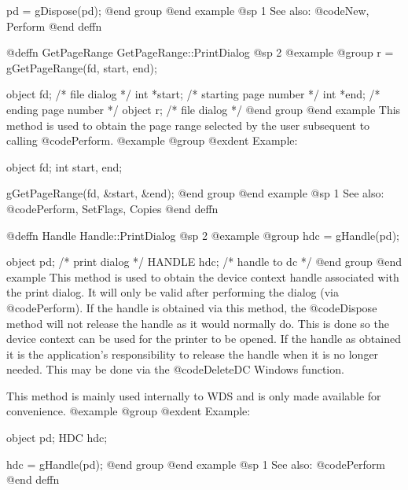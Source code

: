 pd = gDispose(pd);
@end group
@end example
@sp 1
See also:  @code{New, Perform}
@end deffn











@deffn {GetPageRange} GetPageRange::PrintDialog
@sp 2
@example
@group
r = gGetPageRange(fd, start, end);

object  fd;     /*  file dialog           */
int     *start; /*  starting page number  */
int     *end;   /*  ending page number    */
object  r;      /*  file dialog           */
@end group
@end example
This method is used to obtain the page range selected by the user
subsequent to calling @code{Perform}.
@example
@group
@exdent Example:

object  fd;
int     start, end;

gGetPageRange(fd, &start, &end);
@end group
@end example
@sp 1
See also:  @code{Perform, SetFlags, Copies}
@end deffn











@deffn {Handle} Handle::PrintDialog
@sp 2
@example
@group
hdc = gHandle(pd);

object  pd;     /*  print dialog   */
HANDLE  hdc;    /*  handle to dc   */
@end group
@end example
This method is used to obtain the device context handle associated with
the print dialog.  It will only be valid after performing the
dialog (via @code{Perform}).  If the handle is obtained via this method,
the @code{Dispose} method will not release the handle as it would
normally do.  This is done so the device context can be used for the
printer to be opened.  If the handle as obtained it is the application's
responsibility to release the handle when it is no longer needed.  This
may be done via the @code{DeleteDC} Windows function.

This method is mainly used internally to WDS and is only made available
for convenience.
@example
@group
@exdent Example:

object  pd;
HDC     hdc;

hdc = gHandle(pd);
@end group
@end example
@sp 1
See also:  @code{Perform}
@end deffn









